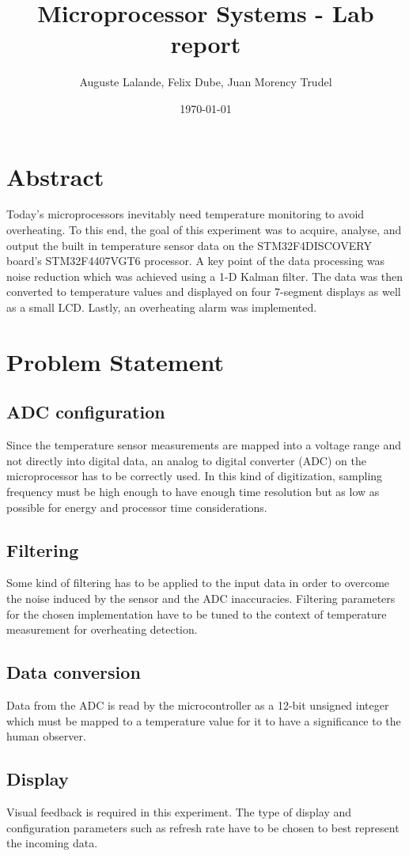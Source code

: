 \documentclass[12pt]{article}
\title{Microprocessor Systems - Lab report}
\author{Auguste Lalande, Felix Dube, Juan Morency Trudel}
\date{\today}
\begin{document}
\maketitle
\clearpage

\tableofcontents
\clearpage

\section{Abstract}
Today's microprocessors inevitably need temperature monitoring to avoid overheating. To this end, the goal of this experiment was to acquire, analyse, and output the built in temperature sensor data on the STM32F4DISCOVERY board's STM32F4407VGT6 processor. A key point of the data processing was noise reduction which was achieved using a 1-D Kalman filter. The data was then converted to temperature values and displayed on four 7-segment displays as well as a small LCD. Lastly, an overheating alarm was implemented.

\section{Problem Statement}
\subsection{ADC configuration} Since the temperature sensor measurements are mapped into a voltage range and not directly into digital data, an analog to digital converter (ADC) on the microprocessor has to be correctly used. In this kind of digitization, sampling frequency must be high enough to have enough time resolution but as low as possible for energy and processor time considerations.
\subsection{Filtering}
Some kind of filtering has to be applied to the input data in order to overcome the noise induced by the sensor and the ADC inaccuracies. Filtering parameters for the chosen implementation have to be tuned to the context of temperature measurement for overheating detection.
\subsection{Data conversion}
Data from the ADC is read by the microcontroller as a 12-bit unsigned integer which must be mapped to a temperature value for it to have a significance to the human observer.
\subsection{Display}
Visual feedback is required in this experiment. The type of display and configuration parameters such as refresh rate have to be chosen to best represent the incoming data.
\end{document}
